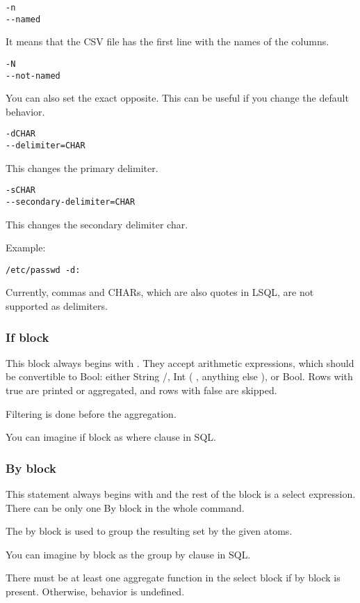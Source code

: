\begin{verbatim}
-n
--named
\end{verbatim}
It means that the CSV file has the first line with the names of the columns.

\begin{verbatim}
-N
--not-named
\end{verbatim}
You can also set the exact opposite. This can be useful if you change the default behavior.

\begin{verbatim}
-dCHAR
--delimiter=CHAR
\end{verbatim}
This changes the primary delimiter.

\begin{verbatim}
-sCHAR
--secondary-delimiter=CHAR
\end{verbatim}
This changes the secondary delimiter char.

Example:
\begin{verbatim}
/etc/passwd -d:
\end{verbatim}

Currently, commas and CHARs, which are also quotes in LSQL, are not supported as delimiters.

\subsubsection{If block}
This block always begins with . They accept arithmetic expressions, which should be convertible to Bool: either String /, Int ( , anything else ), or Bool. 
Rows with true are printed or aggregated, and rows with false are skipped.

Filtering is done before the aggregation.

You can imagine if block as where clause in SQL.

\subsubsection{By block}
This statement always begins with  and the rest of the block is a select expression. There can be only one By block in the whole command.

The by block is used to group the resulting set by the given atoms.

You can imagine by block as the group by clause in SQL. 

There must be at least one aggregate function in the select block if by block is present. Otherwise, behavior is undefined.

